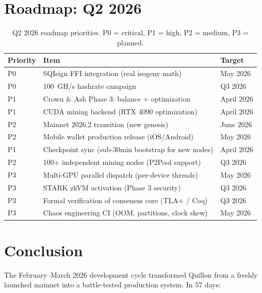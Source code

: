 \documentclass[11pt,a4paper]{article}
\begin{document}
\section{Roadmap: Q2 2026}

\begin{table}[H]
\centering
\begin{tabular}{l l l}
\toprule
\textbf{Priority} & \textbf{Item} & \textbf{Target} \\
\midrule
\rowcolor{qred!10} P0 & SQIsign FFI integration (real isogeny math) & May 2026 \\
\rowcolor{qred!10} P0 & 100~GH/s hashrate campaign & Q3 2026 \\
\rowcolor{qorange!10} P1 & Crown \& Ash Phase 3: balance + optimization & April 2026 \\
\rowcolor{qorange!10} P1 & CUDA mining backend (RTX 4090 optimization) & April 2026 \\
\rowcolor{qblue!10} P2 & Mainnet 2026.2 transition (new genesis) & June 2026 \\
\rowcolor{qblue!10} P2 & Mobile wallet production release (iOS/Android) & May 2026 \\
\rowcolor{qorange!10} P1 & Checkpoint sync (sub-30min bootstrap for new nodes) & April 2026 \\
\rowcolor{qblue!10} P2 & 100+ independent mining nodes (P2Pool support) & Q3 2026 \\
\rowcolor{qgreen!10} P3 & Multi-GPU parallel dispatch (per-device threads) & May 2026 \\
\rowcolor{qgreen!10} P3 & STARK zkVM activation (Phase 3 security) & Q3 2026 \\
\rowcolor{qgreen!10} P3 & Formal verification of consensus core (TLA+ / Coq) & Q3 2026 \\
\rowcolor{qgreen!10} P3 & Chaos engineering CI (OOM, partitions, clock skew) & May 2026 \\
\bottomrule
\end{tabular}
\caption{Q2 2026 roadmap priorities. P0 = critical, P1 = high, P2 = medium, P3 = planned.}
\end{table}

\section{Conclusion}

The February--March 2026 development cycle transformed Quillon from a freshly launched mainnet into a battle-tested production system. In 57 days:
\end{document}
